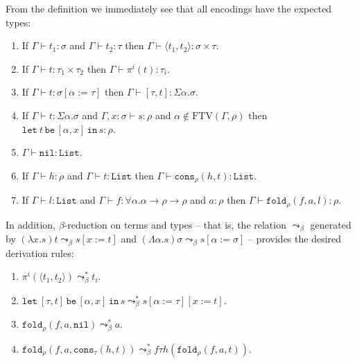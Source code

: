 \documentclass[a4paper,UKenglish,cleveref,autoref,numberwithinsect]{lipics-v2019}
\theoremstyle{definition}
\newcommand{\arrtype}{\rightarrow}
\newcommand{\subst}[2]{#1:=#2}
\newcommand{\abs}[2]{\lambda #1.#2}
\newcommand{\tabs}[2]{\Lambda #1.#2}
\newcommand{\pair}[2]{\langle #1,#2 \rangle}
\newcommand{\expair}[2]{[#1,#2]}
\newcommand{\FTV}{\mathrm{FTV}}
\newcommand{\proves}{\vdash}
\newcommand{\List}{\mathtt{List}}
\newcommand{\nil}{\mathtt{nil}}
\newcommand{\cons}{\mathtt{cons}}
\newcommand{\fold}{\mathtt{fold}}
\newcommand{\xlet}[4]{\mathtt{let}_{#1}\,#2\,\mathtt{be}\,[#3]\,\mathtt{in}\,#4}
\begin{document}
From the definition we immediately see that all encodings have the expected types:

\begin{lemma}\label{lem:encodings_types}
  \begin{enumerate}
  \item If $\Gamma \proves t_1 : \sigma$ and $\Gamma \proves t_2 :
    \tau$ then $\Gamma \proves \pair{t_1}{t_2} : \sigma \times \tau$.
  \item If $\Gamma \proves t : \tau_1 \times \tau_2$ then $\Gamma
    \proves \pi^i(t) : \tau_i$.
  \item If $\Gamma \proves t : \sigma[\subst{\alpha}{\tau}]$ then
    $\Gamma \proves \expair{\tau}{t} : \Sigma \alpha . \sigma$.
  \item If $\Gamma \proves t : \Sigma \alpha . \sigma$ and
    $\Gamma,x:\sigma \proves s : \rho$ and $\alpha \notin
    \FTV(\Gamma,\rho)$ then $\xlet{}{t}{\alpha,x}{s} : \rho$.
  \item $\Gamma \proves \nil : \List$.
  \item If $\Gamma \proves h : \rho$ and $\Gamma \proves t : \List$
    then $\Gamma \proves \cons_\rho(h,t) : \List$.
  \item If $\Gamma \proves l : \List$ and $\Gamma \proves f : \forall
    \alpha . \alpha \arrtype \rho \arrtype \rho$ and $a : \rho$ then
    $\Gamma \proves \fold_\rho(f,a,l) : \rho$.
  \end{enumerate}
\end{lemma}

In addition, $\beta$-reduction on terms and types -- that is, the
relation $\leadsto_\beta$ generated by $(\abs{x}{s})t \leadsto_\beta
s[x:=t]$ and $(\tabs{\alpha}{s})\sigma \leadsto_\beta
s[\alpha:=\sigma]$ -- provides the desired derivation rules:

\begin{lemma}\label{lem:encodings_reduce}
  \begin{enumerate}
  \item $\pi^i(\pair{t_1}{t_2}) \leadsto_\beta^* t_i$.
  \item $\xlet{}{\expair{\tau}{t}}{\alpha,x}{s} \leadsto_\beta^*
    s[\subst{\alpha}{\tau}][\subst{x}{t}]$.
  \item $\fold_\rho(f,a,\nil) \leadsto_\beta^* a$.
  \item $\fold_\rho(f,a,\cons_\tau(h,t)) \leadsto_\beta^* f \tau h
    (\fold_\rho(f,a,t))$.
  \end{enumerate}
\end{lemma}
\end{document}
